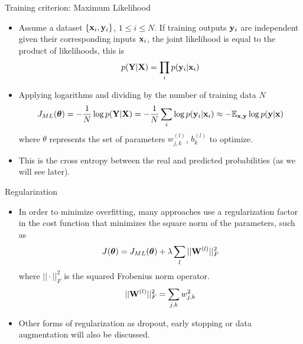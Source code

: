 \documentclass{beamer}
\begin{document}
\begin{frame}{Training criterion: Maximum Likelihood}
\begin{itemize}
\item Assume a dataset $\{{\bf x}_i,{\bf y}_i\}$, $1 \leq i \leq N$. If training outputs ${\bf y}_i$ are independent given their corresponding inputs ${\bf x}_i$, the joint likelihood is equal to the product of likelihoods, this is 
\begin{equation}
    p({\bf Y}|{\bf X}) = \prod_i p({\bf y}_i|{\bf x}_i)
\end{equation}

\item Applying logarithms and dividing by the number of training data $N$ 
\begin{equation}\label{eq:cross_entropy_cost}
J_{ML}({\boldsymbol \theta})=-\frac{1}{N}\log p({\bf Y}|{\bf X}) = -\frac{1}{N}\sum_i \log  p({\bf y}_i|{\bf x}_i) \approx -\mathbb{E}_{{\bf x},{\bf y}} \log p({\bf y}|{\bf x})
\end{equation}
where $\theta$ represents the set of parameters $w^{(l)}_{j,k}$, $b_{k}^{(l)}$ to optimize.  
\item This is the cross entropy between the real and predicted probabilities (as we will see later). 
\end{itemize}
\end{frame}

\begin{frame}{Regularization}
\begin{itemize}
\item In order to minimize overfitting, many approaches use a regularization factor in the cost function that minimizes the square norm of the parameters, such as 
\begin{equation}\label{eq:reg_cross_entropy}
J(\boldsymbol \theta) = J_{ML}(\boldsymbol \theta) + \lambda \sum_{l} ||{\bf W}^{(l)}||_F^2
\end{equation}
where $||\cdot||^2_F$ is the squared Frobenius norm operator.
\begin{equation}
    ||{\bf W}^{(l)}||_F^2 = \sum_{j,k} w^2_{j,k}
\end{equation}
\item Other forms of regularization as dropout, early stopping or data augmentation will also be discussed. 
\end{itemize}
\end{frame}
\end{document}
